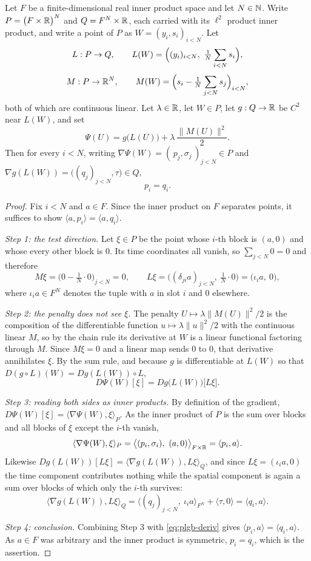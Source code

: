 \begin{lemma}
Let $F$ be a finite-dimensional real inner product space and let $N\in\mathbb{N}$. Write
$P=\bigl(F\times\mathbb{R}\bigr)^N$ and $Q=F^N\times\mathbb{R}$, each carried with its $\ell^2$ product
inner product, and write a point of $P$ as $W=(y_i,s_i)_{i<N}$. Let
\[
  L:P\to Q,\qquad L(W)=\Bigl((y_i)_{i<N},\ \tfrac1N\sum_{i<N}s_i\Bigr),
\]
\[
  M:P\to\mathbb{R}^N,\qquad M(W)=\Bigl(s_i-\tfrac1N\sum_{j<N}s_j\Bigr)_{i<N},
\]
both of which are continuous linear. Let $\lambda\in\mathbb{R}$, let $W\in P$, let $g:Q\to\mathbb{R}$ be
$C^2$ near $L(W)$, and set
\[
  \Psi(U)=g\bigl(L(U)\bigr)+\lambda\,\frac{\|M(U)\|^2}{2}.
\]
Then for every $i<N$, writing $\nabla\Psi(W)=(\,p_j,\sigma_j\,)_{j<N}\in P$ and
$\nabla g(L(W))=\bigl((q_j)_{j<N},\tau\bigr)\in Q$,
\[
  p_i=q_i .
\]
\end{lemma}
\begin{proof}
Fix $i<N$ and $a\in F$. Since the inner product on $F$ separates points, it suffices to
show $\langle a,p_i\rangle=\langle a,q_i\rangle$.

\emph{Step 1: the test direction.}
Let $\xi\in P$ be the point whose $i$-th block is $(a,0)$ and whose every other block is
$0$. Its time coordinates all vanish, so $\sum_{j<N}0=0$ and therefore
\[
  M\xi=\bigl(0-\tfrac1N\cdot 0\bigr)_{j<N}=0,
  \qquad
  L\xi=\bigl((\delta_{ji}a)_{j<N},\ \tfrac1N\cdot 0\bigr)=\bigl(\iota_i a,\ 0\bigr),
\]
where $\iota_i a\in F^N$ denotes the tuple with $a$ in slot $i$ and $0$ elsewhere.

\emph{Step 2: the penalty does not see $\xi$.}
The penalty $U\mapsto\lambda\|M(U)\|^2/2$ is the composition of the differentiable
function $u\mapsto\lambda\|u\|^2/2$ with the continuous linear $M$, so by the chain rule
its derivative at $W$ is a linear functional factoring through $M$. Since $M\xi=0$ and a
linear map sends $0$ to $0$, that derivative annihilates $\xi$. By the sum rule, and
because $g$ is differentiable at $L(W)$ so that $D(g\circ L)(W)=Dg(L(W))\circ L$,
\begin{equation}\label{eq:plgb-deriv}
  D\Psi(W)[\xi]=Dg\bigl(L(W)\bigr)\bigl[L\xi\bigr].
\end{equation}

\emph{Step 3: reading both sides as inner products.}
By definition of the gradient, $D\Psi(W)[\xi]=\langle\nabla\Psi(W),\xi\rangle_P$. As the
inner product of $P$ is the sum over blocks and all blocks of $\xi$ except the $i$-th
vanish,
\[
  \langle\nabla\Psi(W),\xi\rangle_P
    =\bigl\langle (p_i,\sigma_i),\ (a,0)\bigr\rangle_{F\times\mathbb{R}}
    =\langle p_i,a\rangle .
\]
Likewise $Dg(L(W))[L\xi]=\langle\nabla g(L(W)),L\xi\rangle_Q$, and since
$L\xi=(\iota_i a,0)$ the time component contributes nothing while the spatial component
is again a sum over blocks of which only the $i$-th survives:
\[
  \bigl\langle\nabla g(L(W)),L\xi\bigr\rangle_Q
    =\bigl\langle (q_j)_{j<N},\ \iota_i a\bigr\rangle_{F^N}+\langle\tau,0\rangle
    =\langle q_i,a\rangle .
\]

\emph{Step 4: conclusion.}
Combining Step 3 with \eqref{eq:plgb-deriv} gives $\langle p_i,a\rangle=\langle
q_i,a\rangle$. As $a\in F$ was arbitrary and the inner product is symmetric, $p_i=q_i$,
which is the assertion.
\end{proof}
